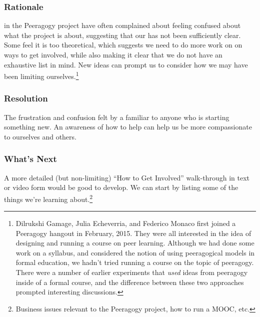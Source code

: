 \subsubsection*{Rationale}  in the Peeragogy project have often complained
about feeling confused about what the project is about, suggesting that our 
has not been sufficiently clear.  Some feel it is too theoretical, which suggests
we need to do more work on  on ways to get involved, while also
making it clear that we do not have an exhaustive list in mind.  New ideas can prompt us to consider how we may have been limiting ourselves.\footnote{Dilrukshi Gamage, Julia Echeverria, and Federico Monaco first joined a Peeragogy hangout in February, 2015.  They were all interested in the idea of designing and running a course on peer learning.  Although we had done some work on a syllabus, and considered the notion of using peeragogical models in formal education, we hadn't tried running a course on the topic of peeragogy.  There were a number of earlier experiments that \emph{used} ideas from peeragogy inside of a formal course, and the difference between these two approaches prompted interesting discussions.}

\subsubsection*{Resolution}
The frustration and confusion felt by a  familiar to anyone who is starting something new.  An awareness of how to help  can help us be more compassionate to ourselves and others.

\subsubsection*{What's Next} A more detailed (but non-limiting) ``How to Get Involved'' walk-through in text or video form would be good to develop. We can start by listing some of the things we're learning about.\footnote{Business issues relevant to the Peeragogy project, how to run a MOOC, etc.}

